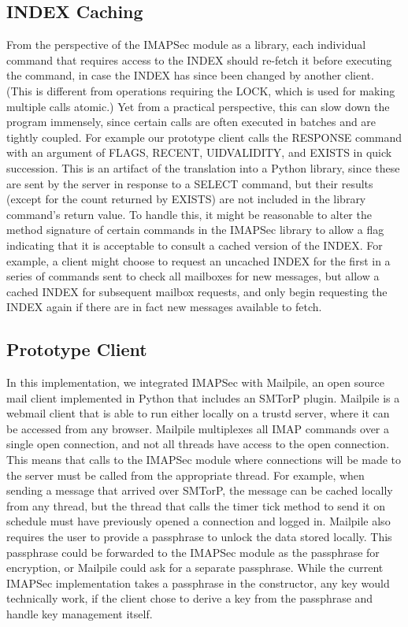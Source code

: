 \documentclass[pageno]{jpaper}
\newcommand{\project}{IMAPSec }
\begin{document}
\subsection{INDEX Caching}
From the perspective of the \project module as a library, each individual command that requires access to the INDEX should re-fetch it before executing the command, in case the INDEX has since been changed by another client. (This is different from operations requiring the LOCK, which is used for making multiple calls atomic.) Yet from a practical perspective, this can slow down the program immensely, since certain calls are often executed in batches and are tightly coupled. For example our prototype client calls the RESPONSE command with an argument of FLAGS, RECENT, UIDVALIDITY, and EXISTS in quick succession. This is an artifact of the translation into a Python library, since these are sent by the server in response to a SELECT command, but their results (except for the count returned by EXISTS) are not included in the library command's return value. To handle this, it might be reasonable to alter the method signature of certain commands in the \project library to allow a flag indicating that it is acceptable to consult a cached version of the INDEX. For example, a client might choose to request an uncached INDEX for the first in a series of commands sent to check all mailboxes for new messages, but allow a cached INDEX for subsequent mailbox requests, and only begin requesting the INDEX again if there are in fact new messages available to fetch.

\subsection{Prototype Client}
In this implementation, we integrated \project with Mailpile, an open source mail client implemented in Python that includes an SMTorP plugin. Mailpile is a webmail client that is able to run either locally on a trustd server, where it can be accessed from any browser. Mailpile multiplexes all IMAP commands over a single open connection, and not all threads have access to the open connection. This means that calls to the \project module where connections will be made to the server must be called from the appropriate thread. For example, when sending a message that arrived over SMTorP, the message can be cached locally from any thread, but the thread that calls the timer tick method to send it on schedule must have previously opened a connection and logged in. Mailpile also requires the user to provide a passphrase to unlock the data stored locally. This passphrase could be forwarded to the \project module as the passphrase for encryption, or Mailpile could ask for a separate passphrase. While the current \project implementation takes a passphrase in the constructor, any key would technically work, if the client chose to derive a key from the passphrase and handle key management itself.
\end{document}
